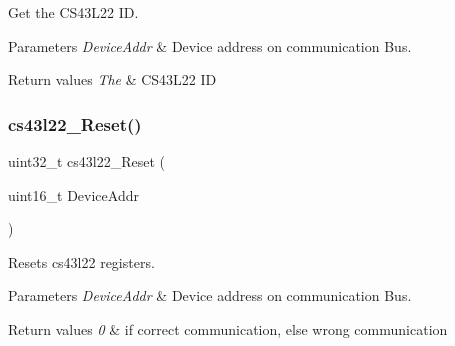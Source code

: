 Get the C\+S43\+L22 ID. 


\begin{DoxyParams}{Parameters}
{\em Device\+Addr} & Device address on communication Bus. ~\newline
\\
\hline
\end{DoxyParams}

\begin{DoxyRetVals}{Return values}
{\em The} & C\+S43\+L22 ID \\
\hline
\end{DoxyRetVals}
\mbox{\label{group___c_s43_l22___exported___functions_ga647488feb466972a5557a2fe2e9350e7}} 
\subsubsection{\texorpdfstring{cs43l22\+\_\+\+Reset()}{cs43l22\_Reset()}}
{\footnotesize\ttfamily uint32\+\_\+t cs43l22\+\_\+\+Reset (\begin{DoxyParamCaption}\item[{uint16\+\_\+t}]{Device\+Addr }\end{DoxyParamCaption})}



Resets cs43l22 registers. 


\begin{DoxyParams}{Parameters}
{\em Device\+Addr} & Device address on communication Bus. \\
\hline
\end{DoxyParams}

\begin{DoxyRetVals}{Return values}
{\em 0} & if correct communication, else wrong communication \\
\hline
\end{DoxyRetVals}
\mbox{\label{group___c_s43_l22___exported___functions_ga579c0ef6455060e9117632f8d83d606a}} 
